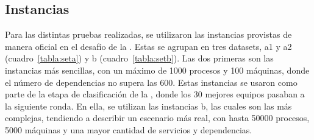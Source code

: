 \documentclass[../informe2.tex]{subfiles}
\begin{document}
\subsection{Instancias}
\label{sub:Instancias}
Para las distintas pruebas realizadas, se utilizaron las instancias provistas de manera oficial en el desafío de la \roadef. Estas se agrupan en tres datasets, a1 y a2 (cuadro~\ref{tabla:seta}) y b (cuadro~\ref{tabla:setb}). Las dos primeras son las instancias más sencillas, con un máximo de 1000 procesos y 100 máquinas, donde el número de dependencias no supera las 600. Estas instancias se usaron como parte de la etapa de clasificación de la \roadef, donde los 30 mejores equipos pasaban a la siguiente ronda. En ella, se utilizan las instancias b, las cuales son las más complejas, tendiendo a describir un escenario más real, con hasta 50000 procesos, 5000 máquinas y una mayor cantidad de servicios y dependencias.
\end{document}
